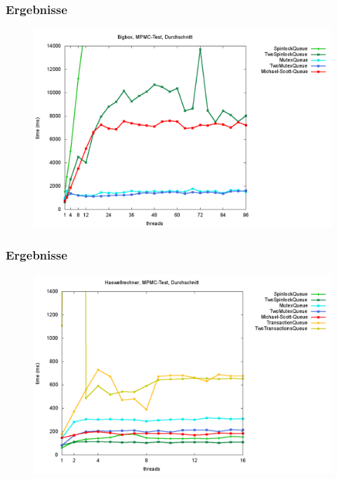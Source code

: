 \documentclass[svgnames]{beamer}
\begin{document}
\begin{frame}
\frametitle{Ergebnisse}
\begin {figure}
      \begin{center}
	\includegraphics[width=\textwidth]{bigboxma.png}
     \end{center}
\end {figure}
\end{frame}

\begin{frame}
\frametitle{Ergebnisse}
\begin {figure}
      \begin{center}
	\includegraphics[width=\textwidth]{fastboxma.png}
     \end{center}
\end {figure}
\end{frame}
\end{document}
